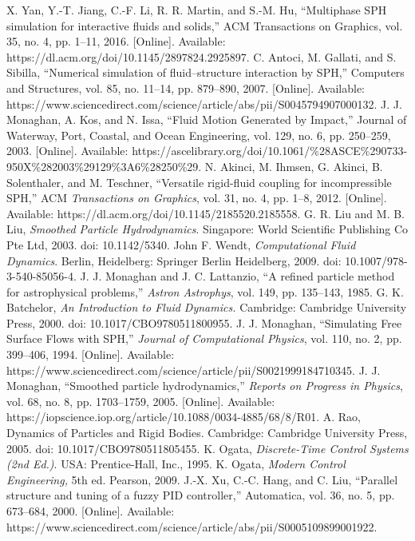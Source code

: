\documentclass{article}
\begin{document}
\begin{thebibliography}{1.7}
	 \color{cyan}X. Yan, Y.-T. Jiang, C.-F. Li, R. R. Martin, and S.-M. Hu, “Multiphase SPH simulation for interactive fluids and solids,” ACM Transactions on Graphics, vol. 35, no. 4, pp. 1–11, 2016. [Online]. Available: https://dl.acm.org/doi/10.1145/2897824.2925897.\color{black}
	 \color{cyan}C. Antoci, M. Gallati, and S. Sibilla, “Numerical simulation of fluid–structure interaction by SPH,” Computers and Structures, vol. 85, no. 11–14, pp. 879–890, 2007. [Online]. Available: https://www.sciencedirect.com/science/article/abs/pii/S0045794907000132.\color{black}
	 \color{cyan}J. J. Monaghan, A. Kos, and N. Issa, “Fluid Motion Generated by Impact,” Journal of Waterway, Port, Coastal, and Ocean Engineering, vol. 129, no. 6, pp. 250–259, 2003. [Online]. Available: https://ascelibrary.org/doi/10.1061/\%28ASCE\%290733-950X\%282003\%29129\%3A6\%28250\%29.\color{black}
	 \color{cyan}N. Akinci, M. Ihmsen, G. Akinci, B. Solenthaler, and M. Teschner, “Versatile rigid-fluid coupling for incompressible SPH,” ACM \textit{Transactions on Graphics}, vol. 31, no. 4, pp. 1–8, 2012. [Online]. Available: https://dl.acm.org/doi/10.1145/2185520.2185558. \color{black}
	 \color{cyan}G. R. Liu and M. B. Liu, \textit{Smoothed Particle Hydrodynamics}. Singapore: World Scientific Publishing Co Pte Ltd, 2003. doi: 10.1142/5340. \color{black}
	 \color{cyan}John F. Wendt, \textit{Computational Fluid Dynamics}. Berlin, Heidelberg: Springer Berlin Heidelberg, 2009. doi: 10.1007/978-3-540-85056-4.\color{black}
	 \color{cyan}J. J. Monaghan and J. C. Lattanzio, “A refined particle method for astrophysical problems,” \textit{Astron Astrophys}, vol. 149, pp. 135–143, 1985.\color{black}
	\color{cyan}G. K. Batchelor, \textit{An Introduction to Fluid Dynamics.} Cambridge: Cambridge University Press, 2000. doi: 10.1017/CBO9780511800955.\color{black}
	 \color{cyan}J. J. Monaghan, “Simulating Free Surface Flows with SPH,” \textit{Journal of Computational Physics}, vol. 110, no. 2, pp. 399–406, 1994. [Online]. Available: https://www.sciencedirect.com/science/article/pii/S0021999184710345.\color{black}
	 \color{cyan}J. J. Monaghan, “Smoothed particle hydrodynamics,” \textit{Reports on Progress in Physics}, vol. 68, no. 8, pp. 1703–1759, 2005. [Online]. Available: https://iopscience.iop.org/article/10.1088/0034-4885/68/8/R01.\color{black}
	 \color{cyan}A. Rao, Dynamics of Particles and Rigid Bodies. Cambridge: Cambridge University Press, 2005. doi: 10.1017/CBO9780511805455.\color{black}
	 \color{cyan}K. Ogata, \textit{Discrete-Time Control Systems (2nd Ed.)}. USA: Prentice-Hall, Inc., 1995.\color{black}
	 \color{cyan}K. Ogata, \textit{Modern Control Engineering,} 5th ed. Pearson, 2009.\color{black}
	 \color{cyan}J.-X. Xu, C.-C. Hang, and C. Liu, “Parallel structure and tuning of a fuzzy PID controller,” Automatica, vol. 36, no. 5, pp. 673–684, 2000. [Online]. Available: https://www.sciencedirect.com/science/article/abs/pii/S0005109899001922.\color{black}
	
\end{thebibliography}
\end{document}
